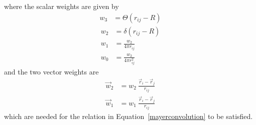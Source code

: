 \documentclass[double,12pt]{beavtex}
\begin{document}
where the scalar weights are given by
\begin{align} 
      w_3 &= \Theta(r_{ij}-R)  \label{scalar-weight3} 
\end{align} 
\begin{align} 
      w_2 &= \delta(r_{ij}-R) \\
      w_1 &= \frac{w_2}{4\pi r_{ij}}  \\
      w_0 &= \frac{w_2}{4\pi r_{ij}^2} \label{scalar-weight0}
\end{align}
and the two vector weights are
\begin{align}
      \vec {w}_2 &= w_2~\frac{\vec r_i-\vec r_j}{r_{ij}} \\
      \vec {w}_1 &= w_1~\frac{\vec r_i-\vec r_j}{r_{ij}}
\end{align}
which are needed for the relation in Equation~\ref{mayerconvolution} to be satisfied.
\end{document}
